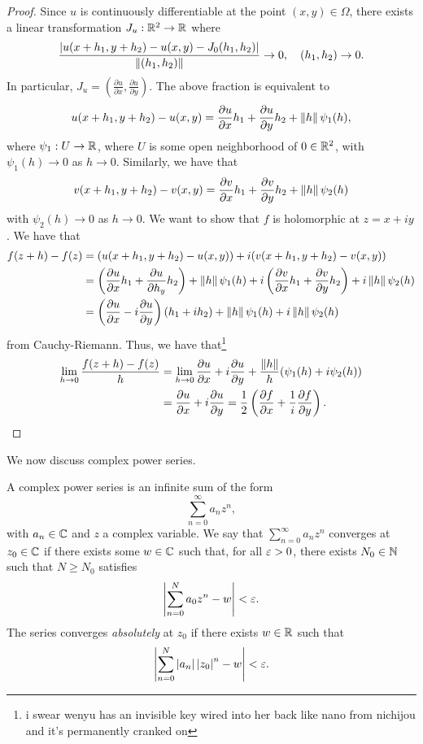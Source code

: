 \begin{proof}
    Since $u$ is continuously differentiable at the point $(x, y) \in \Omega$, there exists a linear transformation $J_u : \mathbb R^2 \to \mathbb R$ where
    \[ \frac{\left\lvert u(x+h_1, y+h_2) - u(x, y) - J_0(h_1, h_2) \right\rvert}{\left\lVert (h_1, h_2) \right\rVert}  \to 0, \quad (h_1, h_2) \to 0. \]
    In particular, $J_u = (\frac{\partial u}{\partial x}, \frac{\partial u}{\partial y})$. The above fraction is equivalent to
    \[ u(x + h_1, y + h_2) - u(x, y) = \frac{\partial u}{\partial x} h_1 + \frac{\partial u}{\partial y} h_2 + \left\lVert h \right\rVert \psi_1(h), \]
    where $\psi_1 : U \to \mathbb R$, where $U$ is some open neighborhood of $0 \in \mathbb R^2$, with $\psi_1(h) \to 0$ as $h \to 0$. Similarly, we have that
    \[ v(x + h_1, y + h_2) - v(x, y) = \frac{\partial v}{\partial x} h_1 + \frac{\partial v}{\partial y} h_2 + \left\lVert h \right\rVert \psi_2(h) \]
    with $\psi_2(h) \to 0$ as $h \to 0$. We want to show that $f$ is holomorphic at $z = x + iy$. We have that
    \begin{align*}
        f(z + h) - f(z) &= (u(x + h_1, y + h_2) - u(x, y)) + i(v(x + h_1, y + h_2) - v(x, y)) \\
        &= \left(\frac{\partial u}{\partial x} h_1 + \frac{\partial u}{\partial h_y} h_2\right) + \left\lVert h \right\rVert \psi_1(h) + i\left(\frac{\partial v}{\partial x} h_1 + \frac{\partial v}{\partial y} h_2\right) + i \left\lVert h \right\rVert \psi_2(h) \\
        &= \left(\frac{\partial u}{\partial x} - i \frac{\partial u}{\partial y}\right) (h_1 + ih_2) + \left\lVert h \right\rVert \psi_1(h) + i \left\lVert h \right\rVert \psi_2(h)
    \end{align*}
    from Cauchy-Riemann. Thus, we have that\footnote{i swear wenyu has an invisible key wired into her back like nano from nichijou and it's permanently cranked on}
    \begin{align*}
        \lim_{h \to 0} \frac{f(z+h) - f(z)}{h} &= \lim_{h \to 0} \frac{\partial u}{\partial x} + i \frac{\partial u}{\partial y} + \frac{\left\lVert h \right\rVert}{h} (\psi_1(h) + i \psi_2(h)) \\
        &= \frac{\partial u}{\partial x} + i \frac{\partial u}{\partial y} = \frac{1}{2} \left(\frac{\partial f}{\partial x} + \frac{1}{i} \frac{\partial f}{\partial y}\right). \qedhere
    \end{align*}
\end{proof}
\noindent We now discuss complex power series.
\begin{definition}
    A complex power series is an infinite sum of the form
    \[ \sum_{n=0}^\infty a_n z^n, \]
    with $a_n \in \mathbb C$ and $z$ a complex variable. We say that $\sum_{n=0}^\infty a_n z^n$ converges at $z_0 \in \mathbb C$ if there exists some $w \in \mathbb C$ such that, for all $\varepsilon > 0$, there exists $N_0 \in \mathbb N$ such that $N \geq N_0$ satisfies
    \[ \left\lvert \sum_{n=0}^N a_0 z^n - w \right\rvert < \varepsilon. \]
    The series converges \textit{absolutely} at $z_0$ if there exists $w \in \mathbb R$ such that
    \[ \left\lvert \sum_{n=0}^N \left\lvert a_n \right\rvert \left\lvert z_0 \right\rvert^n - w \right\rvert < \varepsilon. \]
\end{definition}
